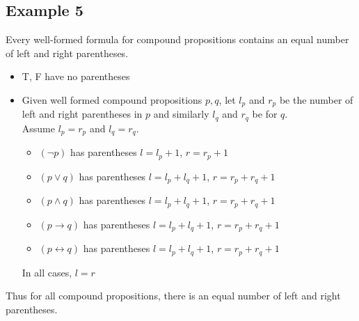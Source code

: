 \documentclass{article}
\theoremstyle{mytheoremstyle}
\theoremstyle{mytheoremstyle}
\theoremstyle{myproblemstyle}
\begin{document}
    \subsection*{Example 5}
    Every well-formed formula for compound propositions contains an equal number
    of left and right parentheses.
    \begin{itemize}
        \item T, F have no parentheses
        \item Given well formed compound propositions $p,q$,
            let $l_p$ and $r_p$ be the number of left and right parentheses in
            $p$ and similarly $l_q$ and $r_q$ be for $q$. \\
            Assume $l_p=r_p$ and $l_q=r_q$.
            \begin{itemize}
                \item $(\neg p)$ has parentheses $l = l_p+1$, $r=r_p+1$
                \item $(p \vee q)$ has parentheses $l = l_p+l_q+1$, $r=r_p+r_q+1$
                \item $(p \wedge q)$ has parentheses $l = l_p+l_q+1$, $r=r_p+r_q+1$
                \item $(p \rightarrow q)$ has parentheses $l = l_p+l_q+1$, $r=r_p+r_q+1$
                \item $(p \leftrightarrow q)$ has parentheses $l = l_p+l_q+1$, $r=r_p+r_q+1$
            \end{itemize}
            In all cases, $l=r$
    \end{itemize}
    Thus for all compound propositions, there is an equal number of left and
    right parentheses.
\end{document}
